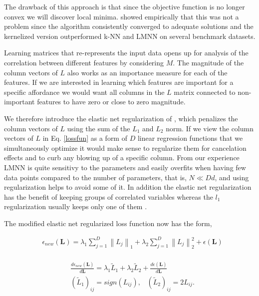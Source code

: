 The drawback of this approach is that since the objective function is no
longer convex we will discover local minima. \cite{Torresani:2006wb}
showed empirically that this was not a problem since the algorithm
consistently converged to adequate solutions and the kernelized version
outperformed k-NN and LMNN on several benchmark datasets.

Learning matrices that re-represents the input data opens up for
analysis of the correlation between different features by considering
\(M\). The magnitude of the column vectors of \(L\) also works as an
importance measure for each of the features. If we are interested in
learning which features are important for a specific affordance we would
want all columns in the \(L\) matrix connected to non-important features
to have zero or close to zero magnitude.

We therefore introduce the elastic net regularization of
\cite{Cimpoi:2015eg}, which penalizes the column vectors of \(L\) using
the sum of the \(L_1\) and \(L_2\) norm. If we view the column vectors
of \(L\) in Eq. \ref{lossfun} as a form of \(D\) linear regression
functions that we simultaneously optimize it would make sense to
regularize them for cancelation effects and to curb any blowing up of a
specific column. From our experience LMNN is quite sensitivy to the
parameters and easily overfits when having few data points compared to
the number of parameters, that is, \(N \ll Dd\), and using
regularization helps to avoid some of it. In addition the elastic net
regularization has the benefit of keeping groups of correlated variables
whereas the \(l_1\) regularization usually keeps only one of them
\cite{Cimpoi:2015eg}.

The modified elastic net regularized loss function now has the form,

\small 

\begin{equation}
\label{lossfun}
\begin{aligned}
& \epsilon_{new}(\mathbf{L}) = \lambda_1 \sum_{j=1}^{D} \left\lVert L_j  \right\rVert_1 + \lambda_2 \sum_{j=1}^{D} \left\lVert L_j  \right\rVert_{2}^{2} +   \epsilon(\mathbf{L}) \\
\end{aligned}
\end{equation}

\begin{equation}
\label{lossfunderivative}
\begin{aligned}
& \frac{d\epsilon_{new}(\mathbf{L})}{d\mathbf{L}} =   \lambda_1  \tilde{L}_1 + \lambda_2  \tilde{L}_2 + \frac{d\epsilon(\mathbf{L})}{d\mathbf{L}} \\
& (\tilde{L}_1)_{ij} = sign(L_{ij}), \; \; \; (\tilde{L}_2)_{ij} = 2 L_{ij}.
\end{aligned}
\end{equation}

